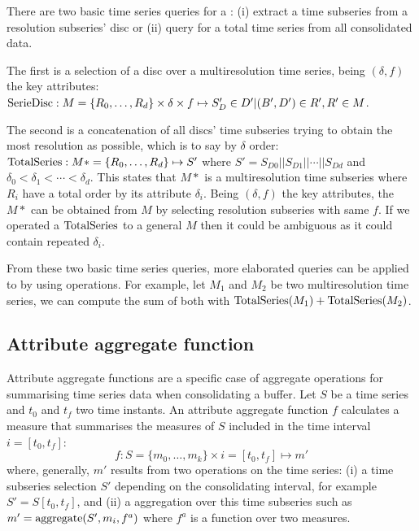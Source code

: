 There are two basic time series queries for a : (i) extract a
time subseries from a resolution subseries' disc or (ii) query for a
total time series from all consolidated data.

The first is a selection of a disc over a multiresolution time series,
being $(\delta,f)$ the key attributes: $\operatorname{SerieDisc}: M=\{R_0, \dots,
R_d\} \times \delta \times f \mapsto S'_D \in D' | (B',D') \in R',R' \in
M$.

The second is a concatenation of all discs' time subseries trying to
obtain the most resolution as possible, which is to say by $\delta$
order: $\operatorname{TotalSeries}: M*=\{R_0, \dots, R_d\} \mapsto S'$ where $S' =
S_{D0} || S_{D1} || \cdots || S_{Dd}$ and $\delta_0 < \delta_1 <
\cdots < \delta_d$. This states that $M*$ is a multiresolution time
subseries where $R_i$ have a total order by its attribute
$\delta_i$. Being $(\delta,f)$ the key attributes, the $M*$ can
be obtained from $M$ by selecting resolution subseries with same $f$. If we
operated a $\operatorname{TotalSeries}$ to a general $M$ then it could be ambiguous
as it could contain repeated $\delta_i$.


From these two basic time series queries, more elaborated queries can
be applied to  by using  operations. For
example, let $M_1$ and $M_2$ be two multiresolution time series, we
can compute the sum of both with $\operatorname{TotalSeries}(M_1) +
\operatorname{TotalSeries}(M_2)$.





\subsection{Attribute aggregate function}
\label{sec:model:interpolador}

Attribute aggregate functions are a specific case of 
aggregate operations for summarising time series data when
consolidating a buffer. Let $S$ be a time series and $t_0$ and $t_f$
two time instants. An attribute aggregate function $f$ calculates a
measure that summarises the measures of $S$ included in the time
interval $i=[t_0,t_f]$:
\[
f : S=\{m_0,\ldots,m_k\} \times i=[t_0,t_f] \mapsto m'
\]
where, generally, $m'$ results from two operations on the time series:
(i) a time subseries selection $S'$ depending on the consolidating
interval, for example $S' = S[t_0,t_f]$, and (ii) a  aggregation
over this time subseries such as $m' = \operatorname*{aggregate}(S',m_i, f^a)$ where $f^a$
is a function over two measures.


